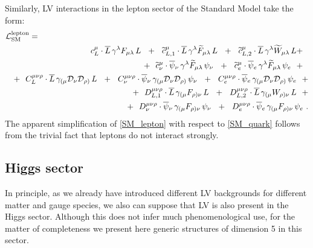 \documentclass[12pt,preprintnumbers,nofootinbib]{revtex4}
\newcommand{\wt}{\widetilde}
\newcommand{\ov}{\overline}
\newcommand{\md}{\mathcal{D}}
\begin{document}


	Similarly, LV interactions in the lepton sector of the Standard Model
	take the form:
\begin{eqnarray}
\nonumber
\lefteqn{
	\mathcal{L}_{\rm SM}^{\rm lepton} =
	}
	\\
\nonumber
	&&
	\phantom{+~~}
	c_L^\mu \cdot
	\ov{L}\, \gamma^{\lambda} F_{\mu\lambda}\, L
	~~+~~
	\wt{c}_{L,1}^\mu \cdot
	\ov{L}\, \gamma^{\lambda} \wt{F}_{\mu\lambda}\, L
	~~+~~
	\wt{c}_{L,2}^\mu \cdot
	\ov{L}\, \gamma^{\lambda} \wt{W}_{\mu\lambda}\, L
	+~~
	\\
\nonumber
	&&
	+~~
	\wt{c}_{\nu}^\mu \cdot
	\ov{\psi}{}_\nu\, \gamma^{\lambda} \wt{F}_{\mu\lambda}\, \psi_\nu
	~~+~~
	\wt{c}_{e}^\mu \cdot
	\ov{\psi}{}_e\, \gamma^{\lambda} \wt{F}_{\mu\lambda}\, \psi_e
	~~+~~
	\\
\nonumber
	&&
	+~~
	C_L^{\mu\nu\rho} \cdot
	\ov{L}\, \gamma_{(\mu} \md_\nu \md_{\rho)}\, L
	~~+~~
	C_{\nu}^{\mu\nu\rho} \cdot
	\ov{\psi}{}_\nu\, \gamma_{(\mu} \md_\nu \md_{\rho)}\, \psi_\nu
	~~+~~
	C_{e}^{\mu\nu\rho} \cdot
	\ov{\psi}{}_e\, \gamma_{(\mu} \md_\nu \md_{\rho)}\, \psi_e
	~~+
	\\
\label{SM_lepton}
	&&
	+~~
	D_{L,1}^{\mu\nu\rho} \cdot
	\ov{L}\, \gamma_{(\mu} F_{\rho)\nu}\, L
	~~+~~
	D_{L,2}^{\mu\nu\rho} \cdot
	\ov{L}\, \gamma_{(\mu} W_{\rho)\nu}\, L
	~~+
	\\
\nonumber
	&&
	+~~
	D_{\nu}^{\mu\nu\rho} \cdot
	\ov{\psi}{}_\nu\, \gamma_{(\mu} F_{\rho)\nu}\, \psi_\nu
	~~+~~
	D_{e}^{\mu\nu\rho} \cdot
	\ov{\psi}{}_e\, \gamma_{(\mu} F_{\rho)\nu}\, \psi_e
	~.
\end{eqnarray}
	The apparent simplification of \eqref{SM_lepton} with respect to 
	\eqref{SM_quark} follows from the trivial fact that leptons do not
	interact strongly.

\subsection{Higgs sector}	
	In principle, as we already have introduced different LV backgrounds
	for different matter and gauge species, we also can suppose that 
	LV is also present in the Higgs sector.
	Although this does not infer much phenomenological use,
	for the matter of completeness we present here generic structures
	of dimension 5 in this sector.
\end{document}
